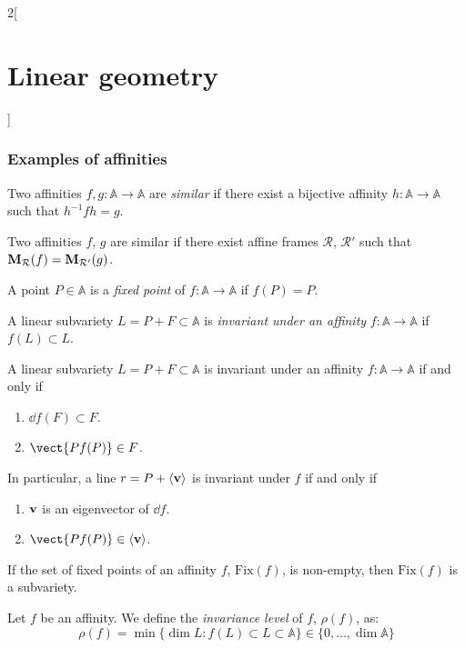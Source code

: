 \documentclass[../../../main.tex]{subfiles}
\begin{document}
\begin{multicols}{2}[\section{Linear geometry}]
  \subsubsection{Examples of affinities}
  \begin{definition}
    Two affinities $f,g:\mathbb{A}\rightarrow\mathbb{A}$ are \emph{similar} if there exist a bijective affinity $h:\mathbb{A}\rightarrow\mathbb{A}$ such that $h^{-1}fh=g$.
  \end{definition}
  \begin{proposition}
    Two affinities $f$, $g$ are similar if there exist affine frames $\mathcal{R}$, $\mathcal{R}'$ such that $\boldsymbol{\mathrm{M}}_\mathcal{R}(f)=\boldsymbol{\mathrm{M}}_{\mathcal{R}'}(g)$.
  \end{proposition}
  \begin{definition}
    A point $P\in\mathbb{A}$ is a \emph{fixed point} of $f:\mathbb{A}\rightarrow\mathbb{A}$ if $f(P)=P$.
  \end{definition}
  \begin{definition}
    A linear subvariety $L=P+F\subset\mathbb{A}$ is \emph{invariant under an affinity} $f:\mathbb{A}\rightarrow\mathbb{A}$ if $f(L)\subset L$.
  \end{definition}
  \begin{proposition}
    A linear subvariety $L=P+F\subset\mathbb{A}$ is invariant under an affinity $f:\mathbb{A}\rightarrow\mathbb{A}$ if and only if
    \begin{enumerate}
      \item $\dd{f(F)}\subset F$.
      \item $\vect{Pf(P)}\in F$.
    \end{enumerate} In particular, a line $r=P+\langle\boldsymbol{\mathrm{v}}\rangle$ is invariant under $f$ if and only if
    \begin{enumerate}
      \item $\boldsymbol{\mathrm{v}}$ is an eigenvector of $\dd{f}$.
      \item $\vect{Pf(P)}\in\langle\vf{v}\rangle$.
    \end{enumerate}
  \end{proposition}
  \begin{proposition}
    If the set of fixed points of an affinity $f$, $\text{Fix}(f)$, is non-empty, then $\text{Fix}(f)$ is a subvariety.
  \end{proposition}
  \begin{definition}
    Let $f$ be an affinity. We define the \emph{invariance level} of $f$, $\rho(f)$, as: $$\rho(f)=\min\{\dim L:f(L)\subset L\subset\mathbb{A}\}\in\{0,\ldots,\dim\mathbb{A}\}$$

\end{definition}
\end{multicols}
\end{document}
